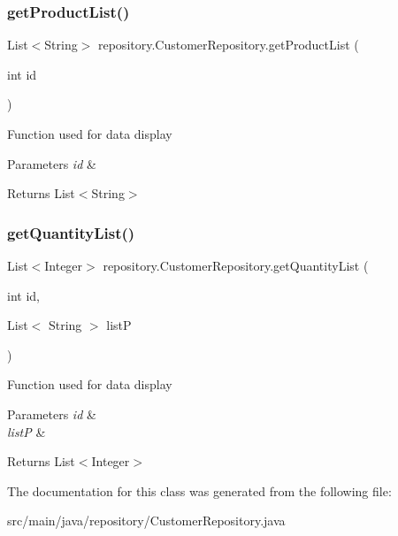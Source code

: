 \subsubsection{\texorpdfstring{get\+Product\+List()}{getProductList()}}
{\footnotesize\ttfamily List$<$String$>$ repository.\+Customer\+Repository.\+get\+Product\+List (\begin{DoxyParamCaption}\item[{int}]{id }\end{DoxyParamCaption})\hspace{0.3cm}{\ttfamily [inline]}}

Function used for data display 
\begin{DoxyParams}{Parameters}
{\em id} & \\
\hline
\end{DoxyParams}
\begin{DoxyReturn}{Returns}
List$<$\+String$>$ 
\end{DoxyReturn}
\mbox{\label{classrepository_1_1_customer_repository_aaf10d05eb98d9995edda61c3fe5e04f2}} 
\subsubsection{\texorpdfstring{get\+Quantity\+List()}{getQuantityList()}}
{\footnotesize\ttfamily List$<$Integer$>$ repository.\+Customer\+Repository.\+get\+Quantity\+List (\begin{DoxyParamCaption}\item[{int}]{id,  }\item[{List$<$ String $>$}]{listP }\end{DoxyParamCaption})\hspace{0.3cm}{\ttfamily [inline]}}

Function used for data display 
\begin{DoxyParams}{Parameters}
{\em id} & ~\newline
\\
\hline
{\em listP} & \\
\hline
\end{DoxyParams}
\begin{DoxyReturn}{Returns}
List$<$\+Integer$>$ 
\end{DoxyReturn}


The documentation for this class was generated from the following file\+:\begin{DoxyCompactItemize}
\item 
src/main/java/repository/Customer\+Repository.\+java\end{DoxyCompactItemize}
